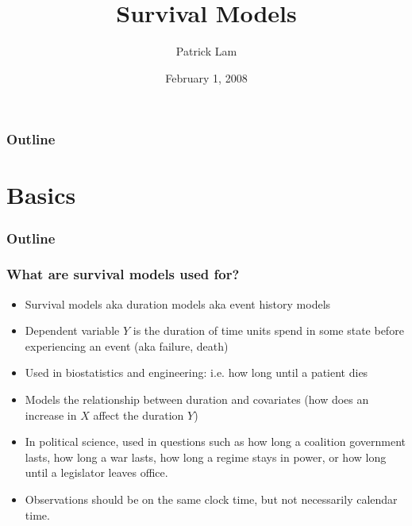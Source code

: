 \documentclass[handout]{beamer}
\author{Patrick Lam}
\title{Survival Models}
\date{February 1, 2008}
\begin{document}
\frame{\titlepage}

\begin{frame}
\frametitle{Outline}
\tableofcontents
\end{frame}

\section{Basics}

\begin{frame}
\frametitle{Outline}
\tableofcontents[currentsection]
\end{frame}

\begin{frame}
\frametitle{What are survival models used for?}
\begin{itemize}
\item Survival models aka duration models aka event history models
\pause
\item Dependent variable $Y$ is the duration of time units spend in some
state before experiencing an event (aka failure, death)
\pause
\item Used in biostatistics and engineering: i.e. how long until a patient
dies
\pause
\item Models the relationship between duration and covariates (how
does an increase in $X$ affect the duration $Y$)
\pause
\item In political science, used in questions such as how long a
coalition government lasts, how long a war lasts, how long a regime
stays in power, or how long until a legislator leaves office.
\pause
\item Observations should be on the same clock time, but not
necessarily calendar time.
\end{itemize}
\end{frame}
\end{document}
